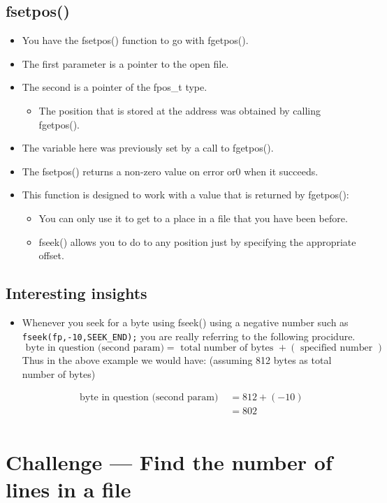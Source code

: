 \subsection{fsetpos()}
\begin{itemize}
    \item You have the fsetpos() function to go with fgetpos().
    
    \item The first parameter is a pointer to the open file.
    \item The second is a pointer of the fpos\_t type.
        \begin{itemize}
            \item The position that is stored at the address was obtained by calling fgetpos().
        \end{itemize}

    \item The variable here was previously set by a call to fgetpos().
    \item The fsetpos() returns a non-zero value on error or0 when it succeeds.
    \item This function is designed to work with a value that is returned by fgetpos():
        \begin{itemize}
            \item You can only use it to get to a place in a file that you have been before.
            \item fseek() allows you to do to any position just by specifying the appropriate offset.
        \end{itemize}
    
\end{itemize}

\subsection{Interesting insights}
\begin{itemize}
    \item Whenever you seek for a byte using fseek() using a negative number such as \texttt{fseek(fp,-10,SEEK_END);} you are really referring to the following procidure.
        \[
            \text{ byte in question (second param)} = \text{ total number of bytes } + (\text{ specified number }) 
        \]
        Thus in the above example we would have: (assuming 812 bytes as total number of bytes)
        \begin{center}
           \begin{align*}
                \text{ byte in question (second param) } &= 812 + (-10) \\ 
                &= 802 \\ 
           \end{align*}
        \end{center}
\end{itemize}


\section{Challenge — Find the number of lines in a file}
